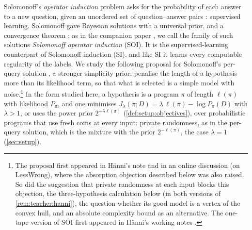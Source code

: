 Solomonoff's \emph{operator induction} problem asks for the probability of each answer to a new question, given an unordered set of question--answer pairs \citep{solomonoff1999two,solomonoff2008three}: supervised learning. Solomonoff gave Bayesian solutions with a universal prior, and a convergence theorem \citep{solomonoff2008three}; as in the companion paper \citep{claudeSFI2026fundamentals}, we call the family of such solutions \emph{Solomonoff operator induction} (SOI). It is the supervised-learning counterpart of Solomonoff induction (SI), and like SI it learns every computable regularity of the labels. We study the following proposal for Solomonoff's per-query solution \citep[eq.~(10)]{solomonoff2008three}, a stronger simplicity prior: penalise the length of a hypothesis more than its likelihood term, so that what is selected is a simple model with noise.\footnote{The proposal first appeared in H\"anni's note \citep{hanni2026grokking} and in an online discussion (on LessWrong), where the absorption objection described below was also raised. So did the suggestion that private randomness at each input blocks this objection, the three-hypothesis calculation below (in both versions of \cref{rem:teacher:hanni}), the question whether its good model is a vertex of the convex hull, and an absolute complexity bound as an alternative. The one-tape version of SOI first appeared in H\"anni's working notes \citep{hanni2026notes}.} In the form studied here, a hypothesis is a program $\pi$ of length $\ell(\pi)$ with likelihood $P_\pi$, and one minimises $J_\lambda(\pi;D)=\lambda\,\ell(\pi)-\log P_\pi(D)$ with $\lambda>1$, or uses the power prior $2^{-\lambda\ell(\pi)}$ (\cref{def:setup:objectives}), over probabilistic programs that use fresh coins at every input: private randomness, as in the per-query solution, which is the mixture with the prior $2^{-\ell(\pi)}$, the case $\lambda=1$ (\cref{sec:setup}).

